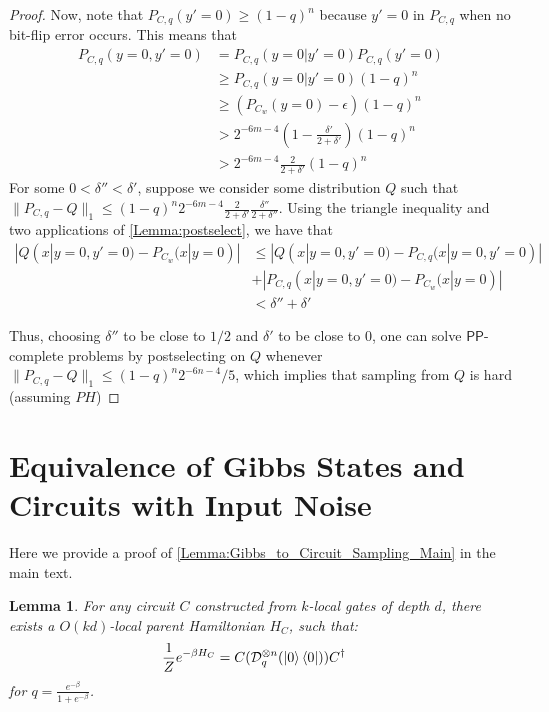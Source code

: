 \documentclass[a4paper,onecolumn,11pt,accepted=2017-05-09]{quantumarticle}
\newcommand{\ox}{\otimes}
\newcommand{\cD}{\mathcal{D}}
\newtheorem{lemma}[theorem]{Lemma}
\begin{document}
\begin{proof}
		Now, note that  $P_{C,q}(y'=0) \geq (1-q)^n$ because $y'=0$ in $P_{C,q}$ when no bit-flip error occurs. This means that
		\begin{align}
			P_{C,q}(y=0,y'=0) &= P_{C,q}(y=0|y'=0)P_{C,q}(y'=0)\\
			&\geq P_{C,q}(y=0|y'=0)(1-q)^n\\
			&\geq (P_{C_w}(y=0) - \epsilon)(1-q)^n\\
			&> 2^{-6m-4}\left(1-\frac{\delta'}{2+\delta'}\right)(1-q)^n\\
			&> 2^{-6m-4}\frac{2}{2+\delta'}(1-q)^n
		\end{align}
		For some $0 < \delta'' < \delta'$, suppose we consider some distribution $Q$ such that $\|P_{C,q} - Q\|_{1} \leq (1-q)^n2^{-6m-4}\frac{2}{2+\delta'}\frac{\delta''}{2+\delta''}$. Using the triangle inequality and two applications of \cref{Lemma:postselect}, we have that
		\begin{align}
			|Q(x|y=0,y'=0) - P_{C_w}(x|y=0)| &\leq |Q(x|y=0,y'=0) - P_{C,q}(x|y=0,y'=0)| \\
			&+ |P_{C,q}(x|y=0,y'=0) - P_{C_w}(x|y=0)|\\
			&< \delta'' + \delta'
		\end{align}
		
		\noindent Thus, choosing $\delta''$ to be close to $1/2$ and $\delta'$ to be close to $0$, one can solve $\textsf{PP}$-complete problems by postselecting on $Q$ whenever $\|P_{C,q} - Q\|_{1} \leq (1-q)^n2^{-6n-4}/5$, which implies that sampling from $Q$ is hard (assuming $PH$)
	\end{proof}



 \section{Equivalence of Gibbs States and Circuits with Input Noise} \label{Appendix:Gibbs_IQP_Equivalence}

  Here we provide a proof of \cref{Lemma:Gibbs_to_Circuit_Sampling_Main} in the main text.
	\begin{lemma}\label{Lemma:Gibbs_to_Circuit_Sampling}
		For any circuit $C$ constructed from $k$-local gates of depth $d$, there exists a $O(kd)$-local parent Hamiltonian $H_C$, such that:
  \begin{align*}
      \frac{1}{Z}e^{-\beta H_C} &= C(\cD_q^{\ox n}(\ket{0}\bra{0}))C^\dagger
  \end{align*}
  for $q = \frac{e^{-\beta}}{1+e^{-\beta}}$.
	\end{lemma}
\end{document}
